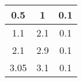 \renewcommand{\arraystretch}{1.2}

\begin{center}\par
\begin{tabular}{|c|c|c|}
\hline
0.5 & 1 & 0.1 \\ \hline
1.1 & 2.1 & 0.1 \\ \hline
2.1 & 2.9 & 0.1 \\ \hline
3.05 & 3.1 & 0.1 \\ \hline
\end{tabular}
\end{center}

